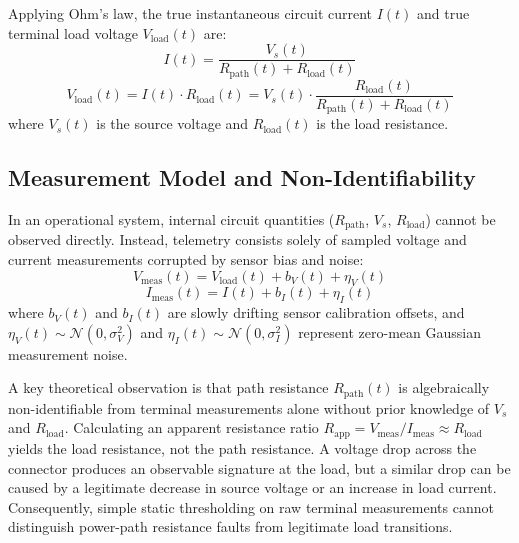 \documentclass[conference]{IEEEtran}
\begin{document}
Applying Ohm's law, the true instantaneous circuit current $I(t)$ and true terminal load voltage $V_{\text{load}}(t)$ are:
\begin{equation}
I(t) = \frac{V_s(t)}{R_{\text{path}}(t) + R_{\text{load}}(t)}
\label{eq:current}
\end{equation}
\begin{equation}
V_{\text{load}}(t) = I(t) \cdot R_{\text{load}}(t) = V_s(t) \cdot \frac{R_{\text{load}}(t)}{R_{\text{path}}(t) + R_{\text{load}}(t)}
\label{eq:voltage}
\end{equation}
where $V_s(t)$ is the source voltage and $R_{\text{load}}(t)$ is the load resistance.

\subsection{Measurement Model and Non-Identifiability}
In an operational system, internal circuit quantities ($R_{\text{path}}$, $V_s$, $R_{\text{load}}$) cannot be observed directly. Instead, telemetry consists solely of sampled voltage and current measurements corrupted by sensor bias and noise:
\begin{equation}
V_{\text{meas}}(t) = V_{\text{load}}(t) + b_V(t) + \eta_V(t)
\label{eq:vmeas}
\end{equation}
\begin{equation}
I_{\text{meas}}(t) = I(t) + b_I(t) + \eta_I(t)
\label{eq:imeas}
\end{equation}
where $b_V(t)$ and $b_I(t)$ are slowly drifting sensor calibration offsets, and $\eta_V(t) \sim \mathcal{N}(0, \sigma_V^2)$ and $\eta_I(t) \sim \mathcal{N}(0, \sigma_I^2)$ represent zero-mean Gaussian measurement noise.

A key theoretical observation is that path resistance $R_{\text{path}}(t)$ is algebraically non-identifiable from terminal measurements alone without prior knowledge of $V_s$ and $R_{\text{load}}$. Calculating an apparent resistance ratio $R_{\text{app}} = V_{\text{meas}} / I_{\text{meas}} \approx R_{\text{load}}$ yields the load resistance, not the path resistance. A voltage drop across the connector produces an observable signature at the load, but a similar drop can be caused by a legitimate decrease in source voltage or an increase in load current. Consequently, simple static thresholding on raw terminal measurements cannot distinguish power-path resistance faults from legitimate load transitions.
\end{document}
